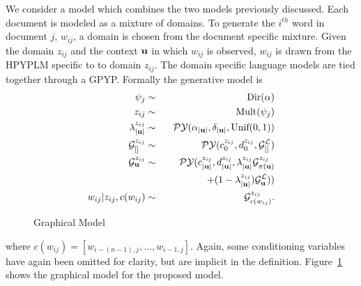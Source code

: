 We consider a model which combines the two models previously discussed.  Each document is modeled as a mixture of domains.  To generate the $i^{th}$ word in document $j$, $w_{ij}$, a domain is chosen from the document specific mixture.  Given the domain $z_{ij}$ and the context $\bu$ in which $w_{ij}$ is observed, $w_{ij}$ is drawn from the HPYPLM specific to to domain $z_{ij}$.  The domain specific language models are tied together through a GPYP.  Formally the generative model is
%
\begin{eqnarray}
	\psi_j  &\sim& \textrm{Dir}(\alpha) \nonumber\\
	z_{ij}  &\sim& \textrm{Mult}(\psi_j) \nonumber\\
	\lambda^{z_{ij}}_{|\bu|} &\sim& \PY(\alpha_{|\bu|}, \delta_{|\bu|}, \textrm{Unif}(0,1)) \nonumber \\
	\G^{z_{ij}}_{[]} &\sim& \PY(c^{ z_{ij}}_0, d^{ z_{ij}}_0,\G^\LA_{[]}) \nonumber \\
	\G^{ z_{ij}}_\bu &\sim& \PY(c^{ z_{ij}}_{|\bu|}, d^{ z_{ij}}_{|\bu|}, \lambda^{ z_{ij}}_{|\bu|}\G^{ z_{ij}}_{\pi(\bu)} \nonumber \\
	&& \hspace{1.5cm} + (1-\lambda^{ z_{ij}}_{|\bu|})\G^\LA_\bu)) \nonumber \\
	w_{ij}| z_{ij}, c(w_{ij}) &\sim& \G^{z_{ij}}_{c(w_{ij})}. \nonumber 
\end{eqnarray}	
%

%
\begin{figure}[t] 
	\begin{center}
		\caption{Graphical Model}
		\label{fig:graphicalmodel}
	\end{center} 
\end{figure} 
%
\noindent where $c(w_{ij}) = [w_{i-(n-1),j}, \ldots, w_{i-1,j}]$.  Again, some conditioning variables  have again been omitted for clarity, but are implicit in the definition.  Figure~\ref{fig:graphicalmodel} shows the graphical model for the proposed model.

